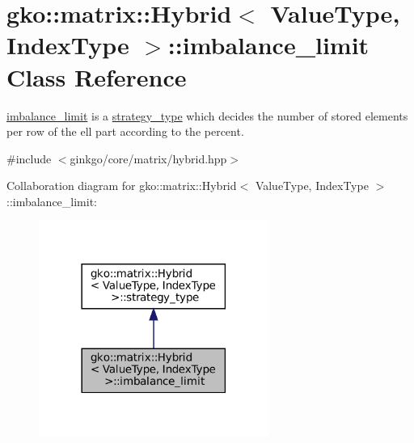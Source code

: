 \hypertarget{classgko_1_1matrix_1_1Hybrid_1_1imbalance__limit}{}\section{gko\+:\+:matrix\+:\+:Hybrid$<$ Value\+Type, Index\+Type $>$\+:\+:imbalance\+\_\+limit Class Reference}
\label{classgko_1_1matrix_1_1Hybrid_1_1imbalance__limit}


\hyperlink{classgko_1_1matrix_1_1Hybrid_1_1imbalance__limit}{imbalance\+\_\+limit} is a \hyperlink{classgko_1_1matrix_1_1Hybrid_1_1strategy__type}{strategy\+\_\+type} which decides the number of stored elements per row of the ell part according to the percent.  




{\ttfamily \#include $<$ginkgo/core/matrix/hybrid.\+hpp$>$}



Collaboration diagram for gko\+:\+:matrix\+:\+:Hybrid$<$ Value\+Type, Index\+Type $>$\+:\+:imbalance\+\_\+limit\+:
\nopagebreak
\begin{figure}[H]
\begin{center}
\leavevmode
\includegraphics[width=213pt]{classgko_1_1matrix_1_1Hybrid_1_1imbalance__limit__coll__graph}
\end{center}
\end{figure}
